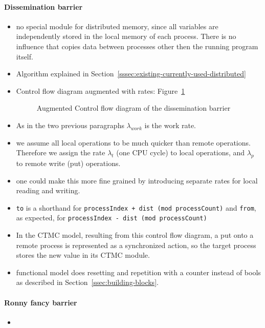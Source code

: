 \documentclass[a4paper, 10pt]{article}
\begin{document}
\begin{enumerate}
\paragraph{Dissemination barrier}
\label{ssssec:analysis-modelchecking-modelling-dissemination}
\begin{itemize}
	\item no special module for distributed memory, since all variables are independently stored in the local memory of each process. There is no influence that copies data between processes other then the running program itself.
	\item Algorithm explained in Section~\ref{sssec:existing-currently-used-distributed}
	\item Control flow diagram augmented with rates: Figure~\ref{fig:dissemination-control-flow}
		\begin{figure}[htbp]
			\centering
			
			\caption{Augmented Control flow diagram of the dissemination barrier}
			\label{fig:dissemination-control-flow}
		\end{figure}
	\item As in the two previous paragraphs $\lambda_{work}$ is the work rate.
	\item we assume all local operations to be much quicker than remote operations. Therefore we assign the rate $\lambda_t$ (one CPU cycle) to local operations, and $\lambda_p$ to remote write (put) operations.
	\item one could make this more fine grained by introducing separate rates for local reading and writing.
	\item \texttt{to} is a shorthand for \texttt{processIndex + dist (mod processCount)} and \texttt{from}, as expected, for \texttt{processIndex - dist (mod processCount)}
	\item In the CTMC model, resulting from this control flow diagram, a put onto a remote process is represented as a synchronized action, so the target process stores the new value in its CTMC module.
	\item functional model does resetting and repetition with a counter instead of bools as described in Section~\ref{ssec:building-blocks}.
\end{itemize}

\paragraph{Ronny fancy barrier}
\label{ssssec:analysis-modelchecking-modelling-ronny-fancy}
\begin{itemize}
	\item 
\end{itemize}


\end{enumerate}
\end{document}

